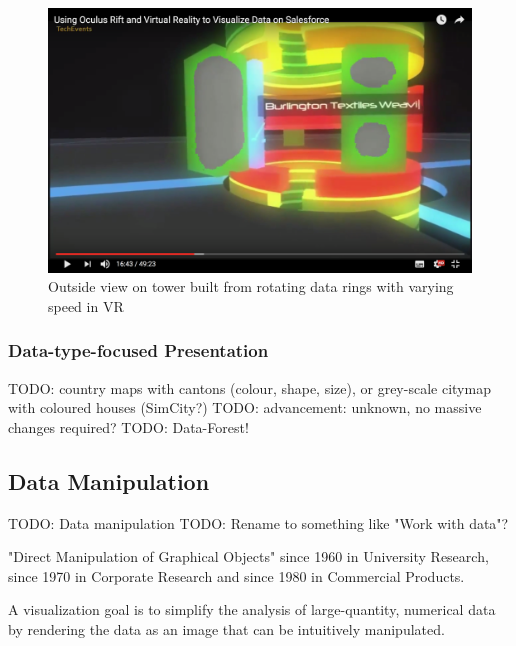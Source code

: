 \begin{figure}[h]
	\begin{center}
		\includegraphics[width=14cm]{03_Figures/05_LitReview/CodeScience2015b.png}
		\caption[Outside view on tower built from rotating data rings with varying speed in VR]{Outside view on tower built from rotating data rings with varying speed in VR \citep{CodeScience2015}}
		\label{fig:rotatingringstower}
	\end{center}
\end{figure}




\subsubsection{Data-type-focused Presentation}

TODO: country maps with cantons (colour, shape, size), or grey-scale citymap with coloured houses (SimCity?)
TODO: advancement: unknown, no massive changes required?
TODO: Data-Forest!



\subsection{Data Manipulation}

TODO: Data manipulation
TODO: Rename to something like "Work with data"?

"Direct Manipulation of Graphical Objects" since 1960 in University Research, since 1970 in Corporate Research and since 1980 in Commercial Products.
\cite{Myers1998}

A visualization goal is to simplify the analysis of large-quantity, numerical data by rendering the data as an image that can be intuitively manipulated.
\cite{Stone1994}

